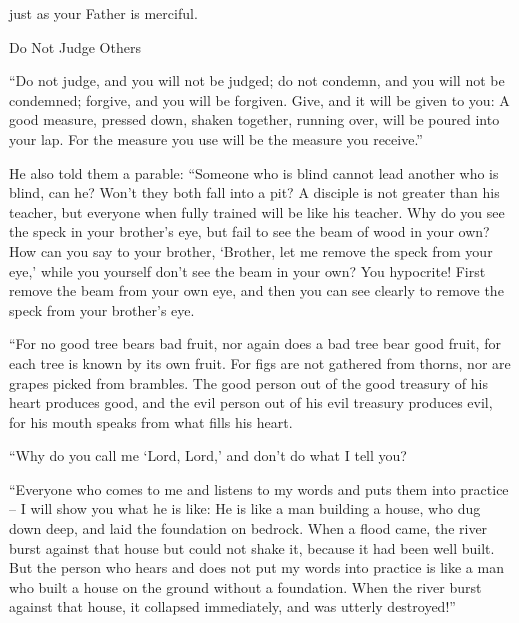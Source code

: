 {just
as your
Father
is
merciful.
\par }{\SH Do Not Judge Others
\par }{\PP {}“Do
not
judge,
and
you will
not
be judged;
do
not
condemn,
and
you will
not
be condemned;
forgive,
and
you will be forgiven.
Give,
and
it will be given
to you: A good
measure,
pressed down,
shaken
together, running over,
will be poured
into
your
lap. For
the measure
you use
will be
the measure
you receive.”
\par }{\PP {}He also
told
them
a parable: “Someone who is blind
cannot
lead
another who is blind,
can he? Won’t
they
both
fall
into
a pit?
A disciple
is
not
greater than
his teacher,
but
everyone
when fully trained
will be
like
his
teacher.
Why
do you see
the speck
in
your
brother’s
eye,
but
fail to see
the beam of wood
in
your own?
How
can
you say
to your
brother,
‘Brother,
let me
remove
the speck
from
your
eye,’
while you
yourself
don’t
see
the beam
in
your
own? You hypocrite! First
remove
the beam
from
your
own eye,
and
then
you can see clearly
to remove
the speck
from your
brother’s
eye.
\par }{\PP {}“For
no
good
tree
bears
bad
fruit,
nor
again
does
a bad
tree
bear
good
fruit,
for
each
tree
is known
by
its own
fruit.
For
figs
are
not
gathered
from
thorns,
nor
are
grapes
picked
from
brambles.
The good
person
out
of the good
treasury
of his heart
produces
good,
and
the evil person
out of
his evil
treasury produces
evil,
for
his
mouth
speaks
from
what fills
his heart.
\par }{\PP {}“Why
do you call
me
‘Lord,
Lord,’
and
don’t
do
what
I tell you?
\par }{\PP {}“Everyone
who comes
to
me
and
listens
to my
words
and
puts
them into practice – I will show you what he is like:
He is
like
a man
building
a house,
who
dug down
deep,
and
laid
the foundation
on
bedrock.
When
a flood
came,
the river
burst against
that
house
but
could
not
shake
it,
because
it
had been
well
built.
But
the person who hears
and
does not
put
my words into practice
is
like
a man
who built
a house
on
the ground
without
a foundation.
When the river
burst against
that
house,
it collapsed immediately,
and
was
utterly destroyed!”

}
